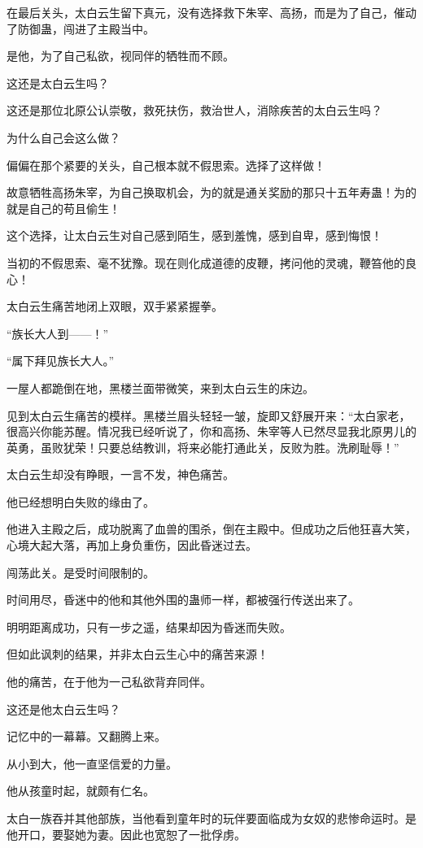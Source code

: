 \begin{this_body}
在最后关头，太白云生留下真元，没有选择救下朱宰、高扬，而是为了自己，催动了防御蛊，闯进了主殿当中。

是他，为了自己私欲，视同伴的牺牲而不顾。

这还是太白云生吗？

这还是那位北原公认崇敬，救死扶伤，救治世人，消除疾苦的太白云生吗？

为什么自己会这么做？

偏偏在那个紧要的关头，自己根本就不假思索。选择了这样做！

故意牺牲高扬朱宰，为自己换取机会，为的就是通关奖励的那只十五年寿蛊！为的就是自己的苟且偷生！

这个选择，让太白云生对自己感到陌生，感到羞愧，感到自卑，感到悔恨！

当初的不假思索、毫不犹豫。现在则化成道德的皮鞭，拷问他的灵魂，鞭笞他的良心！

太白云生痛苦地闭上双眼，双手紧紧握拳。

“族长大人到——！”

“属下拜见族长大人。”

一屋人都跪倒在地，黑楼兰面带微笑，来到太白云生的床边。

见到太白云生痛苦的模样。黑楼兰眉头轻轻一皱，旋即又舒展开来：“太白家老，很高兴你能苏醒。情况我已经听说了，你和高扬、朱宰等人已然尽显我北原男儿的英勇，虽败犹荣！只要总结教训，将来必能打通此关，反败为胜。洗刷耻辱！”

太白云生却没有睁眼，一言不发，神色痛苦。

他已经想明白失败的缘由了。

他进入主殿之后，成功脱离了血兽的围杀，倒在主殿中。但成功之后他狂喜大笑，心境大起大落，再加上身负重伤，因此昏迷过去。

闯荡此关。是受时间限制的。

时间用尽，昏迷中的他和其他外围的蛊师一样，都被强行传送出来了。

明明距离成功，只有一步之遥，结果却因为昏迷而失败。

但如此讽刺的结果，并非太白云生心中的痛苦来源！

他的痛苦，在于他为一己私欲背弃同伴。

这还是他太白云生吗？

记忆中的一幕幕。又翻腾上来。

从小到大，他一直坚信爱的力量。

他从孩童时起，就颇有仁名。

太白一族吞并其他部族，当他看到童年时的玩伴要面临成为女奴的悲惨命运时。是他开口，要娶她为妻。因此也宽恕了一批俘虏。


\end{this_body}
